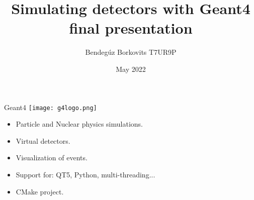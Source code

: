 \documentclass[11pt]{beamer}
\author{Bendegúz Borkovits T7UR9P}
\title{Simulating detectors with Geant4 final presentation}
\institute{Scientific Modelling Computer Laboratory}
\date{May 2022}
\begin{document}
\begin{frame}
\titlepage
\end{frame}

\begin{frame}{Geant4}
    \centering
    \texttt{[image: g4logo.png]}
    \begin{itemize}
        \vspace{0.7 cm}
        \item<tri@1-> Particle and Nuclear physics simulations.
        \vspace{0.2 cm}
        \item<tri@1-> Virtual detectors.
        \vspace{0.2 cm}
        \item<tri@1-> Visualization of events.
        \vspace{0.2 cm}
        \item<tri@1-> Support for: QT5, Python, multi-threading...
        \vspace{0.2 cm}
        \item<tri@1-> CMake project.
    \end{itemize}
\end{frame}
\end{document}
